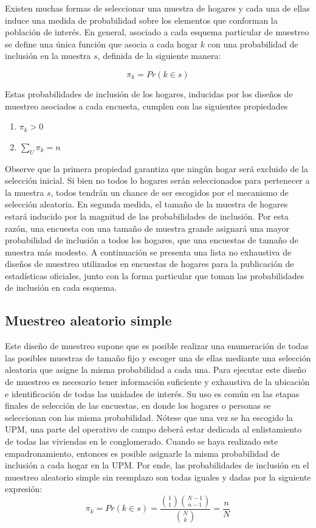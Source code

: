 \documentclass[12pt,spanish,]{book}
\providecommand{\tightlist}{%
  \setlength{\itemsep}{0pt}\setlength{\parskip}{0pt}}
\begin{document}
Existen muchas formas de seleccionar una muestra de hogares y cada una de ellas induce una medida de probabilidad sobre los elementos que conforman la población de interés. En general, asociado a cada esquema particular de muestreo se define una única función que asocia a cada hogar \(k\) con una probabilidad de inclusión en la muestra \(s\), definida de la siguiente manera:

\[\pi_k = Pr (k \in s)\]

Estas probabilidades de inclusión de los hogares, inducidas por los diseños de muestreo asociados a cada encuesta, cumplen con las siguientes propiedades

\begin{enumerate}
\def\labelenumi{\arabic{enumi}.}
\tightlist
\item
  \(\pi_k > 0\)
\item
  \(\sum_U \pi_k = n\)
\end{enumerate}

Observe que la primera propiedad garantiza que ningún hogar será excluido de la selección inicial. Si bien no todos lo hogares serán seleccionados para pertenecer a la muestra \(s\), todos tendrán un chance de ser escogidos por el mecanismo de selección aleatoria. En segunda medida, el tamaño de la muestra de hogares estará inducido por la magnitud de las probabilidades de inclusión. Por esta razón, una encuesta con una tamaño de muestra grande asignará una mayor probabilidad de inclusión a todos los hogares, que una encuestas de tamaño de muestra más modesto. A continuación se presenta una lista no exhaustiva de diseños de muestreo utilizados en encuestas de hogares para la publicación de estadísticas oficiales, junto con la forma particular que toman las probabilidades de inclusión en cada esquema.

\hypertarget{muestreo-aleatorio-simple}{%
\subsection*{Muestreo aleatorio simple}\label{muestreo-aleatorio-simple}}

Este diseño de muestreo supone que es posible realizar una enumeración de todas las posibles muestras de tamaño fijo y escoger una de ellas mediante una selección aleatoria que asigne la misma probabilidad a cada una. Para ejecutar este diseño de muestreo es necesario tener información suficiente y exhaustiva de la ubicación e identificación de todas las unidades de interés. Su uso es común en las etapas finales de selección de las encuestas, en donde los hogares o personas se seleccionan con las misma probabilidad. Nótese que una vez se ha escogido la UPM, una parte del operativo de campo deberá estar dedicada al enlistamiento de todas las viviendas en le conglomerado. Cuando se haya realizado este empadronamiento, entonces es posible asignarle la misma probabilidad de inclusión a cada hogar en la UPM. Por ende, las probabilidades de inclusión en el muestreo aleatorio simple sin reemplazo son todas iguales y dadas por la siguiente expresión:
\[\pi_k = Pr(k \in s) =  \frac{\binom{1}{1}\binom{N-1}{n-1}}{\binom{N}{k}} = \frac{n}{N}\]
\end{document}
